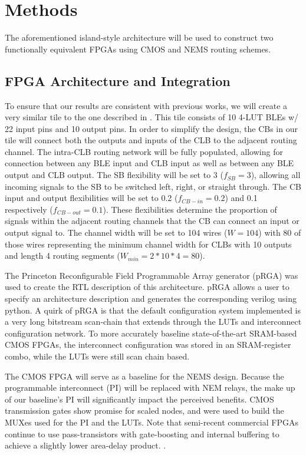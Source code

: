 \documentclass[twoside,twocolumn]{article}
\begin{document}

\section{Methods}\label{sec:methods}
The aforementioned island-style architecture will be used to construct two functionally equivalent FPGAs using CMOS and NEMS routing schemes.

\subsection{FPGA Architecture and Integration}
To ensure that our results are consistent with previous works, we
will create a very similar tile to the one described in \cite{chen_efficient_2010}. 
This tile consists of 10 4-LUT BLEs w/ 22 input pins and 10 output pins.
In order to simplify the design, the CBs in our tile will connect both
the outputs and inputs of the CLB to the adjacent routing channel.
The intra-CLB routing network will be fully populated, allowing for connection 
between any BLE input and CLB input as well as between any BLE output and CLB output.
The SB flexibility will be set to 3 ($f_{SB} = 3$), allowing all 
incoming signals to the SB to be switched left, right, or straight through. 
The CB input and output flexibilities will be set to 0.2 ($f_{CB-in} = 0.2$) 
and 0.1 respectively ($f_{CB-out} = 0.1$). These flexibilities determine the 
proportion of signals within the adjacent routing channels that the CB can 
connect an input or output signal to. The channel width will be set to 104 wires
($W=104$) with 80 of those wires representing the minimum channel width for 
CLBs with 10 outputs and length 4 routing segments ($W_{min} = 2 * 10 * 4 = 80$).


The Princeton Reconfigurable Field Programmable Array generator (pRGA) 
was used to create the RTL description of this architecture.
pRGA allows a user to specify an architecture description and 
generates the corresponding verilog using python. A quirk of 
pRGA is that the default configuration system implemented is 
a very long bitstream scan-chain that extends through the LUTs 
and interconnect configuration network. To more accurately baseline 
state-of-the-art SRAM-based CMOS FPGAs, the interconnect configuration 
was stored in an SRAM-register combo, while the LUTs were still scan chain based.

The CMOS FPGA will serve as a baseline for the NEMS design.
Because the programmable interconnect (PI) will be replaced with NEM relays, the make up
of our baseline's PI will significantly impact the perceived benefits. 
CMOS transmission gates show promise for scaled nodes, and were used to build the MUXes used 
for the PI and the LUTs. Note that semi-recent commercial FPGAs continue to use pass-transistors with gate-boosting and internal buffering
to achieve a slightly lower area-delay product. \cite{chiasson_should_2013}.
\end{document}
